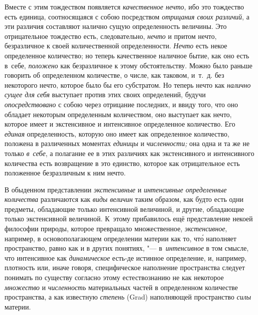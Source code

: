 Вместе с этим тождеством появляется {\em качественное нечто}, ибо это тождество
есть единица, соотносящаяся с собою посредством {\em отрицания своих различий},
а эти различия составляют налично сущую определенность величины. Это
отрицательное тождество есть, следовательно, {\em нечто} и притом нечто,
безразличное к своей количественной определенности. {\em Нечто} есть некое
определенное количество; но теперь качественное наличное бытие, как оно есть
в~себе, {\em положено} как безразличное к этому обстоятельству. Можно было
раньше говорить об определенном количестве, о числе, как таковом, и~т.~д. без
некоторого нечто, которое было бы его субстратом. Но теперь нечто как
{\em налично сущее для себя} выступает против этих своих определений, будучи
{\em опосредствовано} с собою через отрицание последних, и ввиду того, что оно
обладает некоторым определенным количеством, оно выступает как нечто, которое
имеет и экстенсивное и интенсивное определенное количество. Его {\em единая}
определенность, которую оно имеет как определенное количество, положена в
различенных моментах {\em единицы} и {\em численности;} она одна и та же не
только {\em в~себе}, а полагание ее в этих различиях как экстенсивного и
интенсивного количества есть возвращение в это единство, которое как
отрицательное есть положенное безразличным к ним нечто.


В обыденном представлении {\em экстенсивные} и {\em интенсивные определенные
количества} различаются как {\em виды величин} таким образом, как будто есть
одни предметы, обладающие только интенсивной величиной, и другие, обладающие
только экстенсивной величиной. К~этому прибавилось ещё представление
некоей философии природы, которое превращало множественное,
{\em экстенсивное}, например, в основополагающем определении материи как то, чт\'{о} наполняет
пространство, равно как и в других понятиях, "--- в~{\em интенсивное} в
том смысле, что интенсивное как {\em динамическое} есть-де истинное определение,
и, например, плотность или, иначе говоря, специфическое наполнение пространства
следует понимать по существу согласно этому естествознанию не как некоторое
{\em множество} и {\em численность} материальных частей в определенном
количестве пространства, а как известную {\em степень} (Grad) наполняющей
пространство {\em силы} материи.

